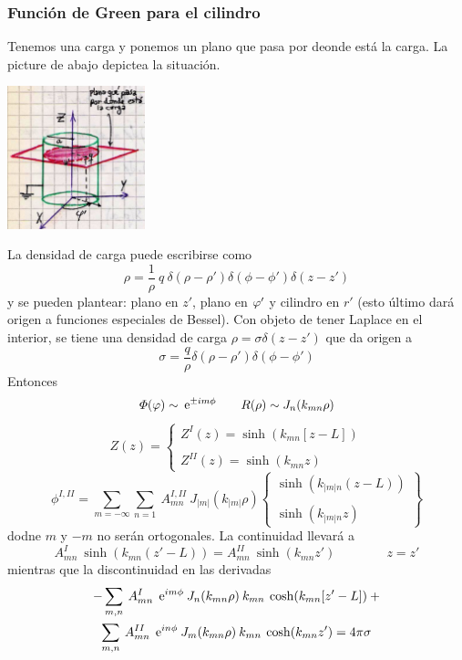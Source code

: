 \documentclass[10pt,oneside]{CBFT_book}
\begin{document}
\subsubsection{Función de Green para el cilindro}

Tenemos una carga y ponemos un plano que pasa por deonde está la carga. 
La picture de abajo depictea la situación.

\includegraphics[width=0.3\textwidth]{images/fig_ft1_cilindricasD.jpg} 

La densidad de carga puede escribirse como
\[
	\rho = \frac{1}{\rho} \: q \: \delta(\rho-\rho') \delta(\phi-\phi')  \delta(z-z')
\]
y se pueden plantear: plano en $z'$, plano en $\varphi'$ y cilindro en $r'$ (esto último dará origen
a funciones especiales de Bessel).
Con objeto de tener Laplace en el interior, se tiene una densidad de carga $ \rho = \sigma \delta(z-z') $
que da origen a
\[
	\sigma = \frac{q}{\rho} \delta(\rho-\rho') \delta(\phi-\phi') 
\]
Entonces
\[
	\Phi(\varphi) \sim \:\mathrm{e}^{\pm i m \phi }  \qquad R(\rho) \sim J_n(k_{mn}\rho)
\]
\[
	Z(z) = \begin{cases}
		Z^I(z) = \sinh( k_{mn}[ z-L ] ) \\
			\\
		Z^{II}(z) = \sinh( k_{mn}z )
	       \end{cases}
\]
\[
	\phi^{I,II} = \sum_{m=-\infty}\sum_{n=1} \: A^{I,II}_{mn} \: J_{|m|}(k_{|m|}\rho) 
		\begin{Bmatrix}
		\sinh( k_{|m|n}(z-L) )	\\
			\\
		\sinh( k_{|m|n}z )	
	       \end{Bmatrix}
\]
dodne $m$ y $-m$ no serán ortogonales.
La continuidad llevará a 
\[
	A^{I}_{mn} \: \sinh( k_{mn}(z'-L) )  = 
	A^{II}_{mn} \: \sinh( k_{mn}z' ) \qquad \qquad z=z'
\]
mientras que la discontinuidad en las derivadas
\begin{multline*}
	- \sum_{m,n} \: A_{mn}^I \: \:\mathrm{e}^{i m \phi} \: J_n(k_{mn}\rho) 
	\: k_{mn} \: \cosh( k_{mn}[z'-L]) \: + \\
	\sum_{m,n} \: A_{mn}^{II} \: \:\mathrm{e}^{i n \phi} \: J_m(k_{mn}\rho) 
	\: k_{mn} \: \cosh( k_{mn}z')
	= 4 \pi \sigma 
\end{multline*}
\end{document}
